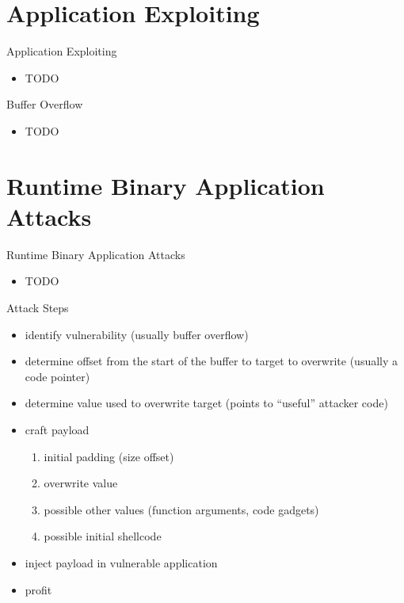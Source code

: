 \documentclass{curs}
\begin{document}
\section{Application Exploiting}

\begin{frame}{Application Exploiting}
  \begin{itemize}
    \item TODO
  \end{itemize}
\end{frame}

\begin{frame}{Buffer Overflow}
  \begin{itemize}
    \item TODO
  \end{itemize}
\end{frame}

\section{Runtime Binary Application Attacks}

\begin{frame}{Runtime Binary Application Attacks}
  \begin{itemize}
    \item TODO
  \end{itemize}
\end{frame}

\begin{frame}{Attack Steps}
  \begin{itemize}
    \item identify vulnerability (usually buffer overflow)
    \item determine offset from the start of the buffer to target to overwrite (usually a code pointer)
    \item determine value used to overwrite target (points to ``useful'' attacker code)
    \item craft payload
      \begin{enumerate}
        \item initial padding (size offset)
        \item overwrite value
        \item possible other values (function arguments, code gadgets)
        \item possible initial shellcode
      \end{enumerate}
    \item inject payload in vulnerable application
    \item profit
  \end{itemize}
\end{frame}
\end{document}
